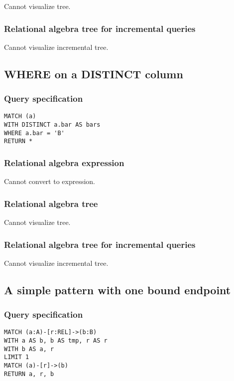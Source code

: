 Cannot visualize tree.

\subsubsection*{Relational algebra tree for incremental queries}

Cannot visualize incremental tree.

\subsection{WHERE on a DISTINCT column}

\subsubsection*{Query specification}

\begin{lstlisting}
MATCH (a)
WITH DISTINCT a.bar AS bars
WHERE a.bar = 'B'
RETURN *
\end{lstlisting}

\subsubsection*{Relational algebra expression}

Cannot convert to expression.

\subsubsection*{Relational algebra tree}

Cannot visualize tree.

\subsubsection*{Relational algebra tree for incremental queries}

Cannot visualize incremental tree.

\subsection{A simple pattern with one bound endpoint}

\subsubsection*{Query specification}

\begin{lstlisting}
MATCH (a:A)-[r:REL]->(b:B)
WITH a AS b, b AS tmp, r AS r
WITH b AS a, r
LIMIT 1
MATCH (a)-[r]->(b)
RETURN a, r, b
\end{lstlisting}


